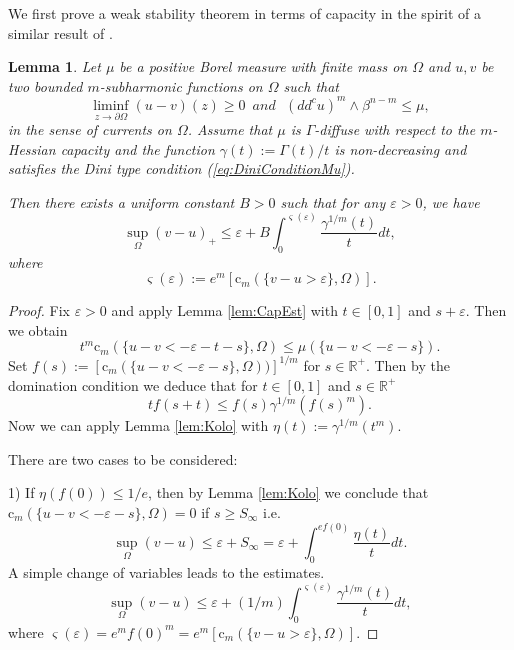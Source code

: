 \documentclass[12pt]{amsart}
\newtheorem{lemma}[theorem]{Lemma}
\theoremstyle{definition}
\numberwithin{theorem}{section}
\numberwithin{equation}{section}
\newcommand{\R}{\mathbb{R}}
\begin{document}
{We first prove a weak stability theorem in terms of capacity in the spirit of  a similar result of \cite{EGZ09}.
  
  
 \begin{lemma}\label{lem:CapacityStability}  
Let  $\mu$ be a positive Borel measure with finite mass on $\Omega$ and $u, v$ be two bounded $m$-subharmonic functions on $\Omega$ such that 
$$
 \liminf_{z\to\partial\Omega}(u-v)(z)\geq 0 \, \, \, { and} \, \, \, \, (dd^c u)^m \wedge \beta^{n-m} \leq \mu,
$$
 in the sense of currents on $\Omega$.
Assume that $\mu$ is $\Gamma$-diffuse with respect to the $m$-Hessian capacity and the function  $ \gamma (t) := \Gamma (t) \slash t$ is non-decreasing and
satisfies the Dini type condition (\ref{eq:DiniConditionMu}).

Then  there exists a  uniform constant $B > 0$  such that for any $\varepsilon > 0$, we have
$$
\sup_{\Omega}(v-u)_+ \leq\varepsilon+ B \int_0^{ \varsigma (\varepsilon)} \frac{\gamma^{1 \slash m}  (t)}{t} d t,
$$
where
$$
\varsigma (\varepsilon) := e^m  \left[\mathrm{c} _{m} (\{v - u>\varepsilon\}, \Omega)\right].
$$
\end{lemma}


\begin{proof} 
 Fix  $\varepsilon > 0$ and apply Lemma \ref{lem:CapEst} with $t \in [0,1] $ and $s + \varepsilon$. Then  we obtain 
\begin{equation}\label{equa}
t^m \mathrm{c} _{m} (\{u-v<-\varepsilon-t-s\},\Omega)\leq \mu \left(\{u-v<-\varepsilon-s\}\right).
\end{equation}
 Set $ f (s) := \left[\mathrm{c} _{m} (\{u-v<-\varepsilon-s\},\Omega) )\right]^{1 \slash m}$ for $s \in \R^+$.
 Then by the domination condition  we deduce that for $t \in [0,1]$ and $s \in \R^+$
$$
t f (s + t) \leq f (s)  \gamma^{1 \slash m} (f (s)^m)
.$$
Now we can apply Lemma \ref{lem:Kolo} with $\eta (t) :=  \gamma^{1 \slash m} (t^m)$. 

There are two cases to be considered:

1) If $\eta (f (0)) \leq 1 \slash e$, then  by   Lemma \ref{lem:Kolo} we conclude that $ \mathrm{c} _{m} (\{u-v<-\varepsilon-s\},\Omega) = 0$ if $s \geq S_{\infty}$ i.e. 
$$
\sup_{\Omega} (v-u) \leq  \varepsilon + S_{\infty} = \varepsilon + \int_0^{e f (0)} \frac{\eta (t)}{t} d t.
$$
A simple change of variables leads to the estimates.
\begin{equation} \label{eq:estimation1}
\sup_{\Omega} (v-u) \leq  \varepsilon + (1 \slash m) \int_0^{\varsigma  (\varepsilon)} \frac{\gamma^{1 \slash m} (t)}{t} d t,
\end{equation}
where $\varsigma  (\varepsilon) = e^m f(0)^m = e^m  \left[\mathrm{c} _{m} (\{v - u>\varepsilon\}, \Omega)\right]$.


\end{proof}}
\end{document}
